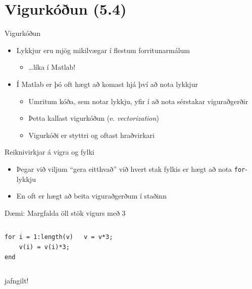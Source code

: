\documentclass{beamer}
\begin{document}
\section{Vigurkóðun (5.4)}

\begin{frame}{Vigurkóðun}
\begin{itemize}
 \item Lykkjur eru mjög mikilvægar í flestum forritunarmálum
 \begin{itemize}
  \item \ldots líka í Matlab!
 \end{itemize}
 \item Í Matlab er þó oft hægt að komast hjá því að nota lykkjur
 \begin{itemize}
  \item Umritum kóða, sem notar lykkju, yfir í að nota sérstakar viguraðgerðir
  \item Þetta kallast vigurkóðun (e. \emph{vectorization})
  \item Vigurkóði er styttri og oftast hraðvirkari
 \end{itemize}
\end{itemize}
\end{frame}

\begin{frame}[fragile]{Reiknivirkjar á vigra og fylki}
\vspace{\baselineskip}
\begin{itemize}
 \item Þegar við viljum ``gera eitthvað'' við hvert stak fylkis er hægt að nota \texttt{for}-lykkju
 \item En oft er hægt að beita viguraðgerðum í staðinn
\end{itemize}
Dæmi: Margfalda öll stök vigurs með 3
\begin{columns}
\begin{verbatim}
for i = 1:length(v)
    v(i) = v(i)*3;
end
\end{verbatim}
\begin{verbatim}
v = v*3;
\end{verbatim}
\end{columns}
\begin{center}
 jafngilt!
\end{center}
\end{frame}
\end{document}
